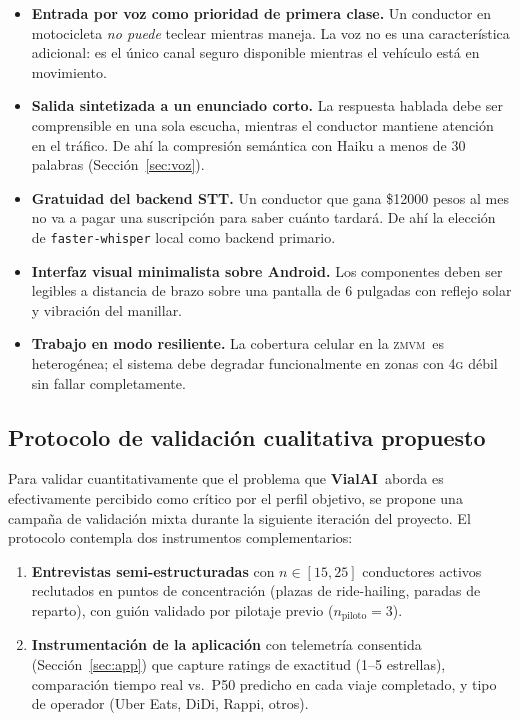\documentclass[11pt,a4paper]{article}
\newcommand{\VialAI}{\textbf{\textcolor{vialTeal}{Vial}\textcolor{vialAmber}{AI}}}
\newcommand{\ZMVM}{\textsc{zmvm}}
\begin{document}
\begin{itemize}
\item \textbf{Entrada por voz como prioridad de primera clase.}
Un conductor en motocicleta \emph{no puede} teclear mientras
maneja. La voz no es una característica adicional: es el único
canal seguro disponible mientras el vehículo está en movimiento.
\item \textbf{Salida sintetizada a un enunciado corto.} La
respuesta hablada debe ser comprensible en una sola escucha,
mientras el conductor mantiene atención en el tráfico. De ahí la
compresión semántica con Haiku a menos de \num{30} palabras
(Sección~\ref{sec:voz}).
\item \textbf{Gratuidad del backend STT.} Un conductor que gana
\$\num{12000} pesos al mes no va a pagar una suscripción para
saber cuánto tardará. De ahí la elección de
\texttt{faster-whisper} local como backend primario.
\item \textbf{Interfaz visual minimalista sobre Android.} Los
componentes deben ser legibles a distancia de brazo sobre una
pantalla de \num{6} pulgadas con reflejo solar y vibración del
manillar.
\item \textbf{Trabajo en modo resiliente.} La cobertura celular
en la \ZMVM\ es heterogénea; el sistema debe degradar
funcionalmente en zonas con \textsc{4g} débil sin fallar
completamente.
\end{itemize}

\subsection{Protocolo de validación cualitativa propuesto}

Para validar cuantitativamente que el problema que \VialAI\ aborda
es efectivamente percibido como crítico por el perfil objetivo,
se propone una campaña de validación mixta durante la siguiente
iteración del proyecto. El protocolo contempla dos instrumentos
complementarios:

\begin{enumerate}
\item \textbf{Entrevistas semi-estructuradas} con
$n \in [15, 25]$ conductores activos reclutados en puntos de
concentración (plazas de ride-hailing, paradas de reparto), con
guión validado por pilotaje previo ($n_\text{piloto} = 3$).
\item \textbf{Instrumentación de la aplicación} con telemetría
consentida (Sección~\ref{sec:app}) que capture ratings de
exactitud (1--5 estrellas), comparación tiempo real vs.\ P50
predicho en cada viaje completado, y tipo de operador
(Uber Eats, DiDi, Rappi, otros).
\end{enumerate}
\end{document}
